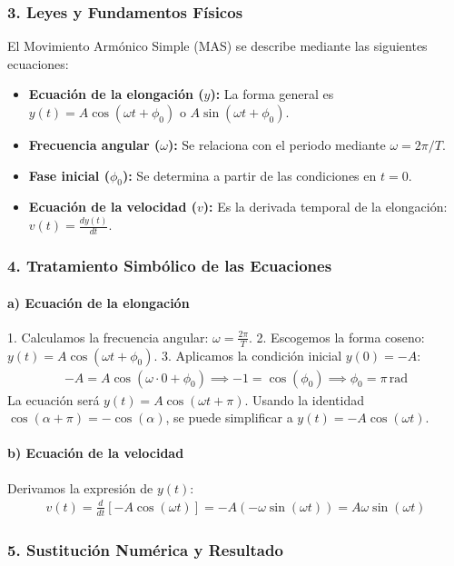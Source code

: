 \subsubsection*{3. Leyes y Fundamentos Físicos}
El Movimiento Armónico Simple (MAS) se describe mediante las siguientes ecuaciones:
\begin{itemize}
    \item \textbf{Ecuación de la elongación ($y$):} La forma general es $y(t) = A \cos(\omega t + \phi_0)$ o $A \sin(\omega t + \phi_0)$.
    \item \textbf{Frecuencia angular ($\omega$):} Se relaciona con el periodo mediante $\omega = 2\pi/T$.
    \item \textbf{Fase inicial ($\phi_0$):} Se determina a partir de las condiciones en $t=0$.
    \item \textbf{Ecuación de la velocidad ($v$):} Es la derivada temporal de la elongación: $v(t) = \frac{dy(t)}{dt}$.
\end{itemize}

\subsubsection*{4. Tratamiento Simbólico de las Ecuaciones}
\paragraph{a) Ecuación de la elongación}
1. Calculamos la frecuencia angular: $\omega = \frac{2\pi}{T}$.
2. Escogemos la forma coseno: $y(t) = A \cos(\omega t + \phi_0)$.
3. Aplicamos la condición inicial $y(0)=-A$:
\begin{gather}
    -A = A \cos(\omega \cdot 0 + \phi_0) \implies -1 = \cos(\phi_0) \implies \phi_0 = \pi \, \text{rad}
\end{gather}
La ecuación será $y(t) = A \cos(\omega t + \pi)$. Usando la identidad $\cos(\alpha + \pi) = -\cos(\alpha)$, se puede simplificar a $y(t) = -A \cos(\omega t)$.

\paragraph{b) Ecuación de la velocidad}
Derivamos la expresión de $y(t)$:
\begin{gather}
    v(t) = \frac{d}{dt}[-A \cos(\omega t)] = -A(-\omega \sin(\omega t)) = A\omega \sin(\omega t)
\end{gather}

\subsubsection*{5. Sustitución Numérica y Resultado}
